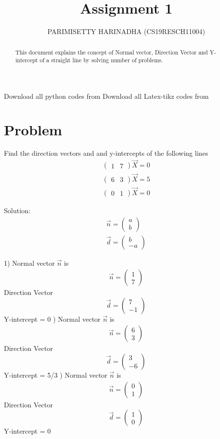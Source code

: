 \documentclass[journal,12pt,twocolumn]{IEEEtran}
\title{Assignment 1}
\author{PARIMISETTY HARINADHA (CS19RESCH11004)}
\newcommand{\myvec}[1]{\ensuremath{\begin{pmatrix}#1\end{pmatrix}}}
\begin{document}
\maketitle
\newpage
\begin{abstract}
This document explains the concept of Normal vector, Direction Vector and Y-intercept of a straight line by solving number of problems.
\end{abstract}
Download all python codes from 
\newline
\newline
Download all Latex-tikz codes from 

\section{Problem}
Find the direction vectors and and y-intercepts of the following lines
\begin{align} 
    		\myvec{ 1 & 7 } \vec{X}	= 0\\
    		\myvec{ 6 & 3 }	\vec{X}	= 5\\
		\myvec{ 0 & 1 }	\vec{X}	= 0
\end{align}

Solution:
\begin{align}
	\vec{n} = \myvec{ a \\ b }\\
	\vec{d} = \myvec{ b \\ -a }
\end{align}

1) Normal vector $\vec{n}$ is   \begin{align}
	\vec{n} = \myvec{ 1 \\ 7 }
\end{align}
Direction Vector
\begin{equation}
		\vec{d} = \myvec{ 7 \\ -1 } 
\end {equation}
\newline
Y-intercept = 0
\newline
{}) Normal vector $\vec{n}$ is \begin{align}
	\vec{n} = \myvec{ 6 \\ 3 }
\end{align}
Direction Vector
\begin{equation}
		\vec{d} = \myvec{ 3 \\ -6 }
\end{equation} 	
\newline
Y-intercept = 5/3
\newline
{}) Normal vector $\vec{n}$ is  \begin{align}
	\vec{n} = \myvec{ 0 \\ 1 }
\end{align} 
Direction Vector
\begin{equation}
		\vec{d} = \myvec{ 1 \\ 0 }
\end{equation}
\newline
Y-intercept =  0
\end{document}
